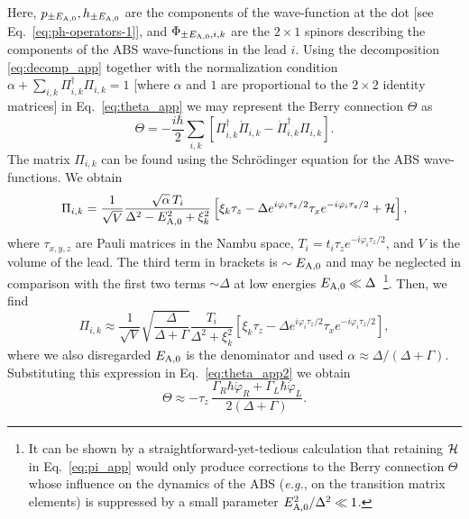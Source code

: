 \documentclass[aps,reprint,longbibliography, prb]{revtex4-2}
\begin{document}
Here, $p_{\pm E_{\rm A, 0}}, h_{\pm E_{\rm A, 0}}$ are the components of the wave-function at the dot [see Eq.~\eqref{eq:ph-operators-1}], and $\Phi_{\pm E_{\rm A, 0},i,k}$ are the $2 \times 1$ spinors describing the components of the ABS wave-functions in the lead $i$. Using the decomposition \eqref{eq:decomp_app} together with the normalization condition $\alpha + \sum_{i,k} \Pi_{i,k}^\dagger \Pi_{i,k} = 1$ [where $\alpha$ and $1$ are proportional to the $2 \times 2$ identity matrices] in Eq.~\eqref{eq:theta_app} we may represent the Berry connection $\Theta$ as
\begin{equation}\label{eq:theta_app2}
    \Theta = -\frac{i\hbar}{2}\sum_{i,k}\left[\Pi_{i,k}^{\dagger}\dot{\Pi}_{i,k}-\dot{\Pi}_{i,k}^{\dagger}\Pi_{i,k} \right].
\end{equation}
The matrix $\Pi_{i,k}$ can be found using the Schr\"odinger equation for the ABS wave-functions. We obtain
\begin{equation}\label{eq:pi_app}
    \Pi_{i, k} = \frac{1}{\sqrt{V}}\frac{\sqrt{\alpha}\, T_i}{\Delta^{2}-E_{\rm A,0}^{2}+\xi_{k}^{2}}\left[\xi_{k}\tau_{z}-\Delta e^{i\varphi_{i}\tau_{z}/2}\tau_{x}e^{-i\varphi_{i}\tau_{z}/2}+{\cal H}\right],
\end{equation}
where $\tau_{x,y,z}$ are Pauli matrices in the Nambu space, $T_i = t_{i}\tau_{z}e^{-i\varphi_{i}\tau_{z}/2}$, and $V$ is the volume of the lead. The third term in brackets is $\sim E_{\rm A,0}$ and may be neglected in comparison with the first two terms $\sim \Delta$ at low energies $E_{\rm A,0} \ll \Delta$~\footnote{It can be shown by a straightforward-yet-tedious calculation that retaining ${\cal H}$ in Eq.~\eqref{eq:pi_app} would only produce corrections to the Berry connection $\Theta$ whose influence on the dynamics of the ABS (\textit{e.g.}, on the transition matrix elements) is suppressed by a small parameter $E_{\rm A,0}^2 / \Delta^2 \ll 1$.}. Then, we find
\begin{equation}
        \Pi_{i, k} \approx \frac{1}{\sqrt{V}} \sqrt{\frac{\Delta}{\Delta + \Gamma}}\frac{T_i}{\Delta^{2}+\xi_{k}^{2}}\left[\xi_{k}\tau_{z}-\Delta e^{i\varphi_{i}\tau_{z}/2}\tau_{x}e^{-i\varphi_{i}\tau_{z}/2}\right],
\end{equation}
where we also disregarded $E_{\rm A,0}$ is the denominator and used $\alpha \approx \Delta / (\Delta + \Gamma)$. Substituting this expression in Eq.~\eqref{eq:theta_app2} we obtain
\begin{equation}\label{eq:connection_app}
    \Theta \approx -\tau_z \, \frac{\Gamma_R \hbar\dot{\varphi}_R + \Gamma_L \hbar\dot{\varphi}_L}{2(\Delta + \Gamma)}.
\end{equation}
\end{document}
